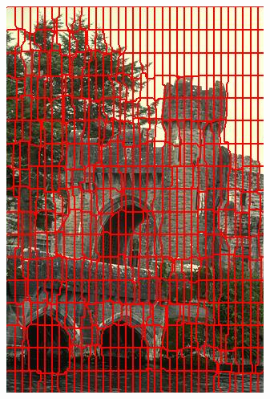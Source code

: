 \begin{figure}
{		\includegraphics[scale=\scalefivebsdtest]{pictures/bsd-test-5-tps}
	}
	\subfigure{
}
\end{figure}
